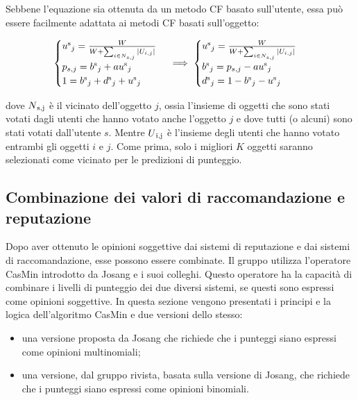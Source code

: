 \documentclass{report}
\begin{document}
	Sebbene l'equazione sia ottenuta da un metodo CF basato sull'utente,
	essa può essere facilmente adattata ai metodi CF basati sull'oggetto:
	
	\begin{center}
	\begin{equation}
	\begin{cases}
		u\textsuperscript{s}_j=\frac{W}{W+\sum_{i \in N_{s,j}}|U_{i,j}|}\\
		p_{s,j}=b\textsuperscript{s}_j+au\textsuperscript{s}_j\\
		1=b\textsuperscript{s}_j+d\textsuperscript{s}_j+u\textsuperscript{s}_j
	\end{cases} \implies 
	\begin{cases}
		u\textsuperscript{s}_j=\frac{W}{W+\sum_{i \in N_{s,j}}|U_{i,j}|}\\
		b\textsuperscript{s}_j=p_{s,j}-au\textsuperscript{s}_j\\
		d\textsuperscript{s}_j=1-b\textsuperscript{s}_j-u\textsuperscript{s}_j
	\end{cases} \label{equazione10}
	\end{equation}
	\end{center}
	
	dove $N\textsubscript{s,j}$ è il vicinato dell'oggetto $j$, ossia l'insieme di oggetti che
	sono stati votati dagli utenti che hanno votato anche l'oggetto $j$ e dove
	tutti (o alcuni) sono stati votati dall'utente $s$. Mentre $U\textsubscript{i,j}$ è
	l'insieme degli utenti che hanno votato entrambi gli oggetti $i$ e $j$. Come
	prima, solo i migliori $K$ oggetti saranno selezionati come vicinato per
	le predizioni di punteggio.
	
	\hypertarget{header-n134}{%
		\subsection{Combinazione dei valori di raccomandazione e
			reputazione}\label{header-n134}}
	
	Dopo aver ottenuto le opinioni soggettive dai sistemi di reputazione e
	dai sistemi di raccomandazione, esse possono essere combinate. Il gruppo
	utilizza l'operatore CasMin introdotto da Josang e i suoi colleghi.
	Questo operatore ha la capacità di combinare i livelli di punteggio dei
	due diversi sistemi, se questi sono espressi come opinioni soggettive.
	In questa sezione vengono presentati i principi e la logica
	dell'algoritmo CasMin e due versioni dello stesso:
	
	\begin{itemize}
		\item
		una versione proposta da Josang che richiede che i punteggi siano
		espressi come opinioni multinomiali;
		\item
		una versione, dal gruppo rivista, basata sulla versione di Josang, che
		richiede che i punteggi siano espressi come opinioni binomiali.
	\end{itemize}
	
\end{document}

